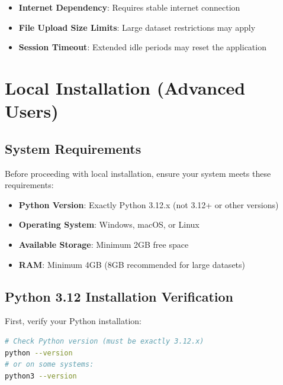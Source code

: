\begin{itemize}
    \item \textbf{Internet Dependency}: Requires stable internet connection
    \item \textbf{File Upload Size Limits}: Large dataset restrictions may apply
    \item \textbf{Session Timeout}: Extended idle periods may reset the application
\end{itemize}

\section{Local Installation (Advanced Users)}

\subsection{System Requirements}

Before proceeding with local installation, ensure your system meets these requirements:

\begin{itemize}
    \item \textbf{Python Version}: Exactly Python 3.12.x (not 3.12+ or other versions)
    \item \textbf{Operating System}: Windows, macOS, or Linux
    \item \textbf{Available Storage}: Minimum 2GB free space
    \item \textbf{RAM}: Minimum 4GB (8GB recommended for large datasets)
\end{itemize}

\subsection{Python 3.12 Installation Verification}

First, verify your Python installation:

\begin{lstlisting}[language=bash]
# Check Python version (must be exactly 3.12.x)
python --version
# or on some systems:
python3 --version
\end{lstlisting}

